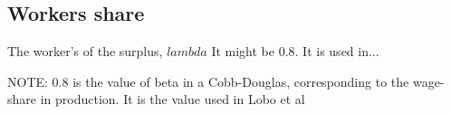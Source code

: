 \subsection{Workers share}
The worker's of the surplus, $lambda$ It might be 0.8. It is used in...

NOTE: 0.8 is the value of beta in a Cobb-Douglas, corresponding to the wage-share in production. It is the value used in Lobo et al


